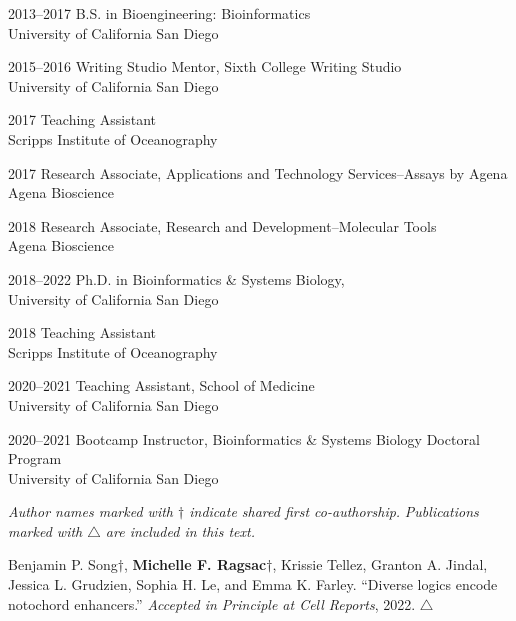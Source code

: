 \documentclass[11pt]{formatting-template}
\begin{document}
\begin{vita}
\noindent
\begin{cv}{}
\begin{cvlist}{}
	\item[2013--2017] B.S. in Bioengineering: Bioinformatics\\
		University of California San Diego
	\item[2015--2016] Writing Studio Mentor, Sixth College Writing Studio\\
		University of California San Diego
	\item[2017] Teaching Assistant\\Scripps Institute of Oceanography 
	\item[2017] Research Associate, Applications and Technology Services--Assays by Agena\\
		Agena Bioscience
	\item[2018] Research Associate, Research and Development--Molecular Tools\\
		Agena Bioscience 
	\item[2018--2022] Ph.D. in Bioinformatics \& Systems Biology,\\
		University of California San Diego
	\item[2018] Teaching Assistant\\
		Scripps Institute of Oceanography
	\item[2020--2021] Teaching Assistant, School of Medicine\\
		University of California San Diego 
	\item[2020--2021] Bootcamp Instructor, Bioinformatics \& Systems Biology Doctoral Program\\
		University of California San Diego 
\end{cvlist}
\end{cv}

\publications{}

\noindent \textit{Author names marked with $\dagger$ indicate shared first co-authorship.} 
\noindent \textit{Publications marked with $\triangle$ are included in this text.} \newline

\noindent Benjamin P. Song$\dagger$, \textbf{Michelle F. Ragsac}$\dagger$, Krissie Tellez, Granton A. Jindal, Jessica L. Grudzien, Sophia H. Le, and Emma K. Farley. ``Diverse logics encode notochord enhancers.'' \textit{Accepted in Principle at Cell Reports}, 2022. $\triangle$ \newline


\end{vita}
\end{document}
